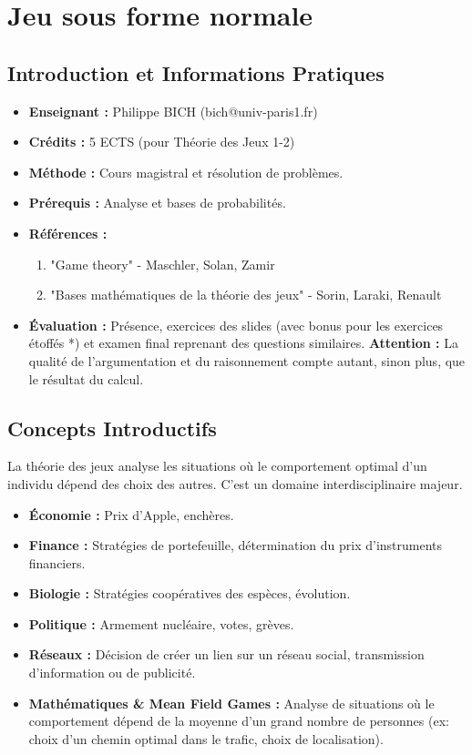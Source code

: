 \chapter{Jeu sous forme normale}

\section{Introduction et Informations Pratiques}

\begin{itemize}
    \item \textbf{Enseignant :} Philippe BICH (bich@univ-paris1.fr)
    \item \textbf{Crédits :} 5 ECTS (pour Théorie des Jeux 1-2)
    \item \textbf{Méthode :} Cours magistral et résolution de problèmes.
    \item \textbf{Prérequis :} Analyse et bases de probabilités.
    \item \textbf{Références :}
        \begin{enumerate}
            \item "Game theory" - Maschler, Solan, Zamir
            \item "Bases mathématiques de la théorie des jeux" - Sorin, Laraki, Renault
        \end{enumerate}
    \item \textbf{Évaluation :} Présence, exercices des slides (avec bonus pour les exercices étoffés *) et examen final reprenant des questions similaires. \textbf{Attention :} La qualité de l'argumentation et du raisonnement compte autant, sinon plus, que le résultat du calcul.
\end{itemize}

\section{Concepts Introductifs}
La théorie des jeux analyse les situations où le comportement optimal d'un individu dépend des choix des autres. C'est un domaine interdisciplinaire majeur.

\begin{itemize}
    \item \textbf{Économie :} Prix d'Apple, enchères.
    \item \textbf{Finance :} Stratégies de portefeuille, détermination du prix d'instruments financiers.
    \item \textbf{Biologie :} Stratégies coopératives des espèces, évolution.
    \item \textbf{Politique :} Armement nucléaire, votes, grèves.
    \item \textbf{Réseaux :} Décision de créer un lien sur un réseau social, transmission d'information ou de publicité.
    \item \textbf{Mathématiques \& Mean Field Games :} Analyse de situations où le comportement dépend de la moyenne d'un grand nombre de personnes (ex: choix d'un chemin optimal dans le trafic, choix de localisation).
\end{itemize}


